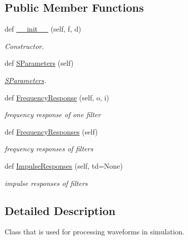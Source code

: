 \subsection*{Public Member Functions}
\begin{DoxyCompactItemize}
\item 
def \hyperlink{classSignalIntegrity_1_1FrequencyDomain_1_1TransferMatrices_1_1TransferMatrices_a7ecbd1152e5e88f11aacf19d825fb16c}{\+\_\+\+\_\+init\+\_\+\+\_\+} (self, f, d)
\begin{DoxyCompactList}\small\item\em Constructor. \end{DoxyCompactList}\item 
def \hyperlink{classSignalIntegrity_1_1FrequencyDomain_1_1TransferMatrices_1_1TransferMatrices_a5624dc56319957b00db2c962426e225e}{S\+Parameters} (self)
\begin{DoxyCompactList}\small\item\em \hyperlink{namespaceSignalIntegrity_1_1SParameters}{S\+Parameters}. \end{DoxyCompactList}\item 
def \hyperlink{classSignalIntegrity_1_1FrequencyDomain_1_1TransferMatrices_1_1TransferMatrices_ae45a1bf3658b88340881c2be54c27dbe}{Frequency\+Response} (self, o, i)
\begin{DoxyCompactList}\small\item\em frequency response of one filter \end{DoxyCompactList}\item 
def \hyperlink{classSignalIntegrity_1_1FrequencyDomain_1_1TransferMatrices_1_1TransferMatrices_a10d1edc43435adc55c7de3f612526ce1}{Frequency\+Responses} (self)
\begin{DoxyCompactList}\small\item\em frequency responses of filters \end{DoxyCompactList}\item 
def \hyperlink{classSignalIntegrity_1_1FrequencyDomain_1_1TransferMatrices_1_1TransferMatrices_a5dbd43adb2b1b1c8de01e58f0f40b190}{Impulse\+Responses} (self, td=None)
\begin{DoxyCompactList}\small\item\em impulse responses of filters \end{DoxyCompactList}\end{DoxyCompactItemize}


\subsection{Detailed Description}
Class that is used for processing waveforms in simulation. 



